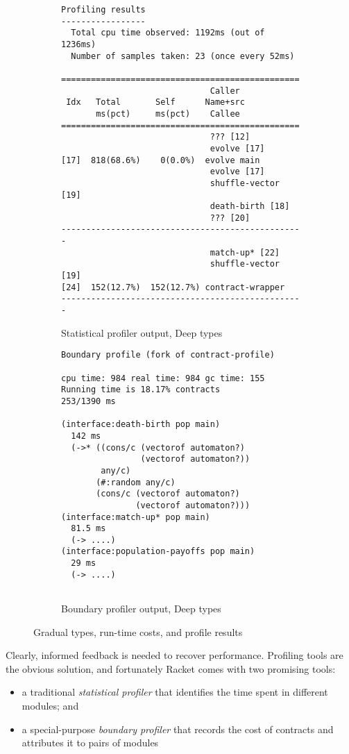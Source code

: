 \begin{figure}[t]
\begin{subfigure}[t]{0.50\columnwidth}
    \footnotesize
    \begin{verbatim}
Profiling results
-----------------
  Total cpu time observed: 1192ms (out of 1236ms)
  Number of samples taken: 23 (once every 52ms)

=================================================
                              Caller
 Idx   Total       Self      Name+src
       ms(pct)     ms(pct)    Callee
=================================================
                              ??? [12]
                              evolve [17]
[17]  818(68.6%)    0(0.0%)  evolve main
                              evolve [17]
                              shuffle-vector [19]
                              death-birth [18]
                              ??? [20]
-------------------------------------------------
                              match-up* [22]
                              shuffle-vector [19]
[24]  152(12.7%)  152(12.7%) contract-wrapper
-------------------------------------------------
    \end{verbatim}
    \caption{Statistical profiler output, Deep types}
    \label{f:fsm-code:statistical}
  \end{subfigure}\qquad
  \begin{subfigure}[t]{0.44\columnwidth}
    \footnotesize
    \begin{verbatim}
Boundary profile (fork of contract-profile)

cpu time: 984 real time: 984 gc time: 155
Running time is 18.17% contracts
253/1390 ms

(interface:death-birth pop main)
  142 ms
  (->* ((cons/c (vectorof automaton?)
                (vectorof automaton?))
        any/c)
       (#:random any/c)
       (cons/c (vectorof automaton?)
               (vectorof automaton?)))
(interface:match-up* pop main)
  81.5 ms
  (-> ....)
(interface:population-payoffs pop main)
  29 ms
  (-> ....)


    \end{verbatim}

    \caption{Boundary profiler output, Deep types}
    \label{f:fsm-code:boundary}
  \end{subfigure}
  \caption{Gradual types, run-time costs, and profile results}
  \label{f:fsm-code}
\end{figure}

Clearly, informed feedback is needed to recover performance.
Profiling tools are the obvious solution, and fortunately Racket
comes with two promising tools:
\begin{itemize}
  \item a traditional \emph{statistical profiler} that identifies the time spent
    in different modules; and
  \item a special-purpose \emph{boundary profiler} that records the cost of
    contracts and attributes it to pairs of modules
\end{itemize}

